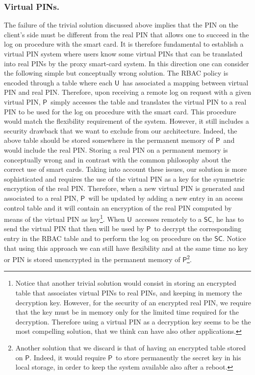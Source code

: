 \documentclass[preprint,authoryear,12pt]{elsarticle}
\newcommand{\User}{\ensuremath{\mathsf{U}}}
\newcommand{\Proxy}{\ensuremath{\mathsf{P}}}
\newcommand{\SC}{\ensuremath{\mathsf{SC}}}
\begin{document}
\subsubsection{Virtual PINs.}
The failure of the trivial solution discussed above implies that the PIN on the client's side must be different from the real PIN that allows one to succeed in the log on procedure with the smart card. It is therefore fundamental to establish a virtual PIN system where users know some virtual PINs that can be translated into real PINs by the proxy smart-card system. In this direction one can consider the following simple but conceptually wrong solution. The RBAC policy is encoded through a table where each \User\ has associated a mapping between virtual PIN and real PIN. Therefore, upon receiving a remote log on request with a given virtual PIN, \Proxy\  simply accesses the table and translates the virtual PIN to a real PIN to be used for the log on procedure with the smart card. This procedure would match the flexibility requirement of the system. However, it still includes a security drawback that we want to exclude from our architecture. Indeed, the above table should be stored somewhere in the permanent memory of \Proxy\ and would include the real PIN. Storing a real PIN on a permanent memory is conceptually wrong and in contrast with the common philosophy about the correct use of smart cards.  Taking into account these issues, our solution is more sophisticated and requires the use of the virtual PIN as a key for the symmetric encryption of the real PIN. Therefore, when a new virtual PIN is generated and associated to a real PIN, \Proxy\ will be updated by adding a new entry in an access control table and it will contain an encryption of the real PIN computed by means of the virtual PIN as key\footnote{Notice that another trivial solution would consist in storing an encrypted table that associates virtual PINs to real PINs, and keeping in memory the decryption key. However, for the security of an encrypted real PIN, we require that the key must be in memory only for the limited time required for the decryption. Therefore using a virtual PIN as a decryption key seems to be the most compelling solution, that we think can have also other applications.}. When \User\ accesses remotely to a \SC , he has to send the virtual PIN that then will be used by \Proxy\ to decrypt the corresponding entry in the RBAC table and to perform the log on procedure on the \SC . Notice that using this approach we can still have flexibility and at the same time no key or PIN is stored unencrypted in the permanent memory of \Proxy\footnote{Another solution that we discard is that of having an encrypted table stored on \Proxy. Indeed, it would require \Proxy\ to store permanently the secret key in his local storage, in order to keep the system available also after a reboot.}.
\end{document}
